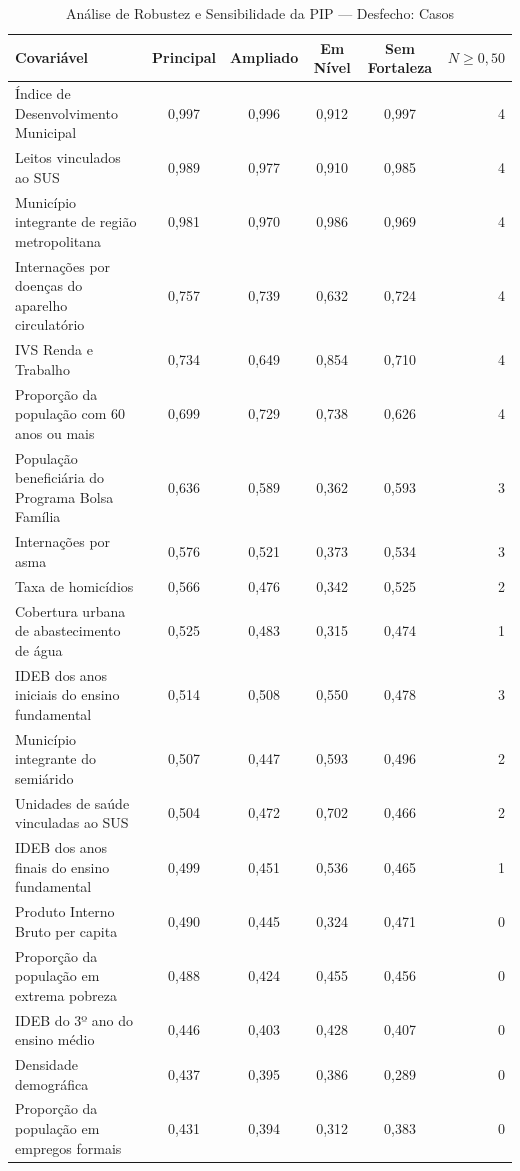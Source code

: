 \begin{table}[htbp]
\centering
\footnotesize
\caption{Análise de Robustez e Sensibilidade da PIP — Desfecho: Casos}
\label{tab:sens_casos}
\begin{tabular}{lccccr}
\toprule
\textbf{Covariável} & \textbf{Principal} & \textbf{Ampliado} & \textbf{Em Nível} & \textbf{Sem Fortaleza} & \textbf{$N \ge 0{,}50$} \\
\midrule
Índice de Desenvolvimento Municipal & 0,997 & 0,996 & 0,912 & 0,997 & 4 \\
Leitos vinculados ao SUS & 0,989 & 0,977 & 0,910 & 0,985 & 4 \\
Município integrante de região metropolitana & 0,981 & 0,970 & 0,986 & 0,969 & 4 \\
Internações por doenças do aparelho circulatório & 0,757 & 0,739 & 0,632 & 0,724 & 4 \\
IVS Renda e Trabalho & 0,734 & 0,649 & 0,854 & 0,710 & 4 \\
Proporção da população com 60 anos ou mais & 0,699 & 0,729 & 0,738 & 0,626 & 4 \\
População beneficiária do Programa Bolsa Família & 0,636 & 0,589 & 0,362 & 0,593 & 3 \\
Internações por asma & 0,576 & 0,521 & 0,373 & 0,534 & 3 \\
Taxa de homicídios & 0,566 & 0,476 & 0,342 & 0,525 & 2 \\
Cobertura urbana de abastecimento de água & 0,525 & 0,483 & 0,315 & 0,474 & 1 \\
IDEB dos anos iniciais do ensino fundamental & 0,514 & 0,508 & 0,550 & 0,478 & 3 \\
Município integrante do semiárido & 0,507 & 0,447 & 0,593 & 0,496 & 2 \\
Unidades de saúde vinculadas ao SUS & 0,504 & 0,472 & 0,702 & 0,466 & 2 \\
IDEB dos anos finais do ensino fundamental & 0,499 & 0,451 & 0,536 & 0,465 & 1 \\
Produto Interno Bruto per capita & 0,490 & 0,445 & 0,324 & 0,471 & 0 \\
Proporção da população em extrema pobreza & 0,488 & 0,424 & 0,455 & 0,456 & 0 \\
IDEB do 3º ano do ensino médio & 0,446 & 0,403 & 0,428 & 0,407 & 0 \\
Densidade demográfica & 0,437 & 0,395 & 0,386 & 0,289 & 0 \\
Proporção da população em empregos formais & 0,431 & 0,394 & 0,312 & 0,383 & 0 \\

\end{tabular}
\end{table}
